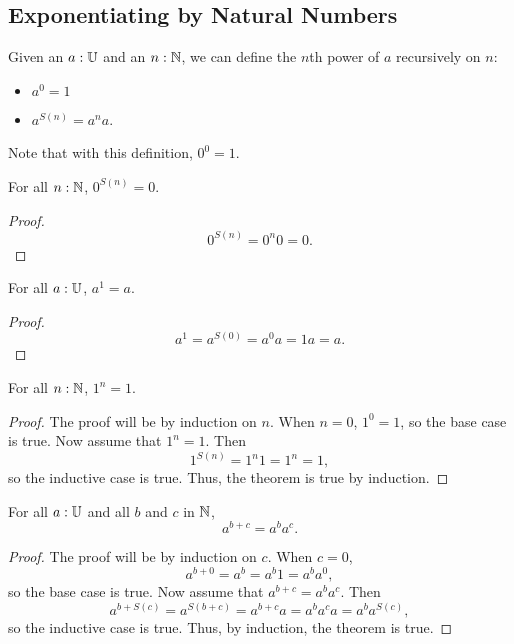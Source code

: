 \documentclass[../math.tex]{subfiles}
\begin{document}
\subsection{Exponentiating by Natural Numbers}

\begin{definition}
    Given an $a : \mathbb{U}$ and an $n : \mathbb{N}$, we can define the $n$th power of $a$
    recursively on $n$:
    \begin{itemize}
        \item $a^0 = 1$
        \item $a^{S(n)} = a^na$.
    \end{itemize}
    Note that with this definition, $0^0 = 1$.
\end{definition}

\begin{theorem}
    For all $n : \mathbb{N}$, $0^{S(n)} = 0$.
\end{theorem}
\begin{proof}
    \[
        0^{S(n)} = 0^n0 = 0.
    \]
\end{proof}

\begin{theorem}
    For all $a : \mathbb{U}$, $a^1 = a$.
\end{theorem}
\begin{proof}
    \[
        a^1 = a^{S(0)} = a^0a = 1a = a.
    \]
\end{proof}

\begin{theorem}
    For all $n : \mathbb{N}$, $1^n = 1$.
\end{theorem}
\begin{proof}
    The proof will be by induction on $n$.  When $n = 0$, $1^0 = 1$, so the base
    case is true.  Now assume that $1^n = 1$.  Then
    \[
        1^{S(n)} = 1^n1 = 1^n = 1,
    \]
    so the inductive case is true.  Thus, the theorem is true by induction.
\end{proof}

\begin{theorem}
    For all $a : \mathbb{U}$ and all $b$ and $c$ in $\mathbb{N}$,
    \[
        a^{b + c} = a^b a^c.
    \]
\end{theorem}
\begin{proof}
    The proof will be by induction on $c$.  When $c = 0$,
    \[
        a^{b + 0} = a^b = a^b1 = a^ba^0,
    \]
    so the base case is true.  Now assume that $a^{b + c} = a^b a^c$.  Then
    \[
        a^{b + S(c)} = a^{S(b + c)} = a^{b + c}a = a^b a^c a = a^b a^{S(c)},
    \]
    so the inductive case is true.  Thus, by induction, the theorem is true.
\end{proof}
\end{document}
